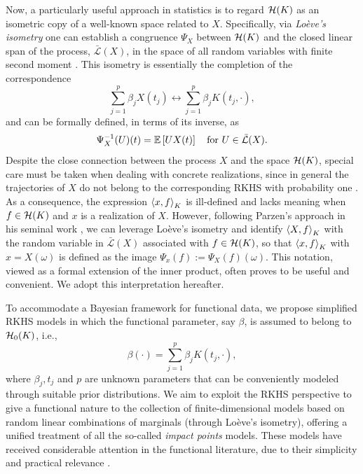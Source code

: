 Now, a particularly useful approach in statistics is to regard \(\mathcal{H}(K)\) as an isometric copy of a well-known space related to \(X\). Specifically, via \textit{Loève's isometry} \citep{loeve1948fonctions} one can establish a congruence \(\Psi_X\) between \(\mathcal{H}(K)\) and the closed linear span of the process, \(\bar{\mathcal L}(X)\), in the space of all random variables with finite second moment \citep[see Lemma 1.1 in][]{lukic2001stochastic}. This isometry is essentially the completion of the correspondence
\begin{equation}\label{eq:loeves-isometry}
  \sum_{j=1}^p \beta_j X(t_j) \longleftrightarrow \sum_{j=1}^p \beta_j K(t_j, \cdot),
\end{equation}
and can be formally defined, in terms of its inverse, as 
\[
  \Psi^{-1}_X(U)(t) = \mathbb{E}\left[U X(t)\right]\quad \text{for } U \in \bar{\mathcal L}(X).
\]
Despite the close connection between the process \(X\) and the space \(\mathcal{H}(K)\), special care must be taken when dealing with concrete realizations, since in general the trajectories of \(X\) do not belong to the corresponding \acs{RKHS} with probability one \citep[][Corollary~7.1]{lukic2001stochastic}. As a consequence, the expression \(\left\langle x,f\right\rangle_K\) is ill-defined and lacks meaning when \(f\in\mathcal{H}(K)\) and \(x\) is a realization of \(X\). However, following Parzen's approach in his seminal work \citep[][Theorem~4E]{parzen1961approach}, we can leverage Loève's isometry and identify \(\left\langle X,f\right\rangle_K\) with the random variable in \(\bar{\mathcal L}(X)\) associated with \(f\in \mathcal{H}(K)\), so that \(\left\langle x,f\right\rangle_K \) with \(x=X(\omega)\) is defined as the image \(\Psi_x(f) := \Psi_X(f)(\omega)\). This notation, viewed as a formal extension of the inner product, often proves to be useful and convenient. We adopt this interpretation hereafter.

To accommodate a Bayesian framework for functional data, we propose simplified \acs{RKHS} models in which the functional parameter, say \(\beta\), is assumed to belong to \(\mathcal{H}_0(K)\), i.e.,
\[
\beta(\cdot) = \sum_{j=1}^p \beta_j K(t_j, \cdot),
\]
where \(\beta_j, t_j\) and \(p\) are unknown parameters that can be conveniently modeled through suitable prior distributions. We aim to exploit the \acs{RKHS} perspective to give a functional nature to the collection of finite-dimensional models based on random linear combinations of marginals (through Loève's isometry), offering a unified treatment of all the so-called \textit{impact points} models. These models have received considerable attention in the functional literature, due to their simplicity and practical relevance \citep[see][]{kneip2016functional,poss2020superconsistent,mckeague2010fractals, lindquist2009logistic}.


